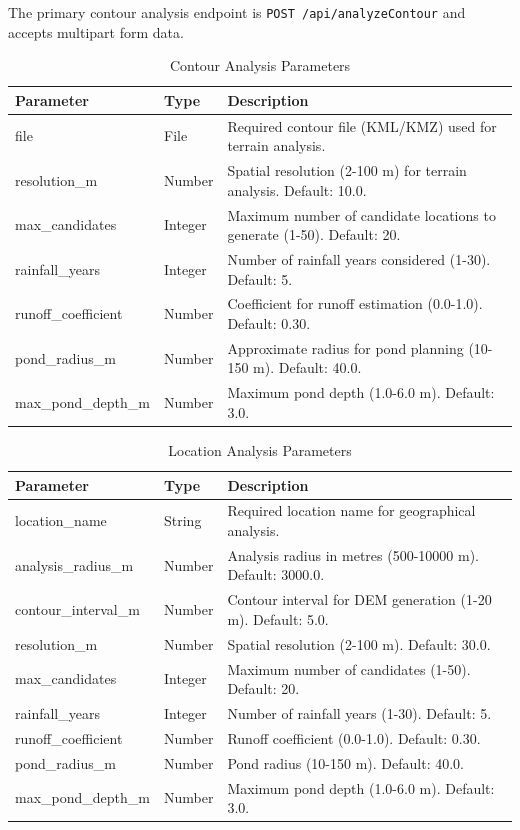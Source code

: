 \documentclass[12pt,a4paper]{article}
\begin{document}
The primary contour analysis endpoint is \texttt{POST /api/analyzeContour} and accepts
multipart form data.

\begin{table}[H]
\centering
\caption{Contour Analysis Parameters}
\begin{tabular}{p{4cm} p{3cm} p{6cm}}
\toprule
\textbf{Parameter} & \textbf{Type} & \textbf{Description} \\
\midrule
file & File & Required contour file (KML/KMZ) used for terrain analysis. \\
resolution\_m & Number & Spatial resolution (2-100 m) for terrain analysis. Default: 10.0. \\
max\_candidates & Integer & Maximum number of candidate locations to generate (1-50). Default: 20. \\
rainfall\_years & Integer & Number of rainfall years considered (1-30). Default: 5. \\
runoff\_coefficient & Number & Coefficient for runoff estimation (0.0-1.0). Default: 0.30. \\
pond\_radius\_m & Number & Approximate radius for pond planning (10-150 m). Default: 40.0. \\
max\_pond\_depth\_m & Number & Maximum pond depth (1.0-6.0 m). Default: 3.0. \\
\bottomrule
\end{tabular}
\end{table}

\begin{table}[H]
\centering
\caption{Location Analysis Parameters}
\begin{tabular}{p{4cm} p{3cm} p{6cm}}
\toprule
\textbf{Parameter} & \textbf{Type} & \textbf{Description} \\
\midrule
location\_name & String & Required location name for geographical analysis. \\
analysis\_radius\_m & Number & Analysis radius in metres (500-10000 m). Default: 3000.0. \\
contour\_interval\_m & Number & Contour interval for DEM generation (1-20 m). Default: 5.0. \\
resolution\_m & Number & Spatial resolution (2-100 m). Default: 30.0. \\
max\_candidates & Integer & Maximum number of candidates (1-50). Default: 20. \\
rainfall\_years & Integer & Number of rainfall years (1-30). Default: 5. \\
runoff\_coefficient & Number & Runoff coefficient (0.0-1.0). Default: 0.30. \\
pond\_radius\_m & Number & Pond radius (10-150 m). Default: 40.0. \\
max\_pond\_depth\_m & Number & Maximum pond depth (1.0-6.0 m). Default: 3.0. \\
\bottomrule
\end{tabular}
\end{table}
\end{document}
